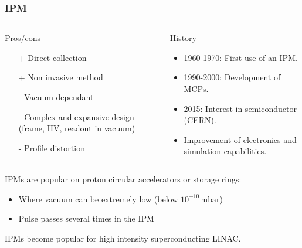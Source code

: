 \begin{frame}
  \frametitle{IPM}
  \begin{columns}[T]
    \begin{column}{0.45\textwidth}
      \begin{block}{Pros/cons}
        \begin{itemize}
          \item[+] Direct collection
          \item[+] Non invasive method
          \item[-] Vacuum dependant
          \item[-] Complex and expansive design (frame, HV, readout in vacuum)
          \item[-] Profile distortion
        \end{itemize}
      \end{block}

    \end{column}
    \begin{column}{0.45\textwidth}
      \begin{block}{History}
        \begin{itemize}
          \item 1960-1970: First use of an IPM.
          \item 1990-2000: Development of MCPs.
          \item 2015: Interest in semiconductor (CERN).
          \item Improvement of electronics and simulation capabilities.
        \end{itemize}
      \end{block}
    \end{column}
  \end{columns}


  IPMs are popular on proton circular accelerators or storage rings:
  \begin{itemize}
    \item Where vacuum can be extremely low (below $10^{-10}\,\mathrm{mbar}$)
    \item Pulse passes several times in the IPM
  \end{itemize}
  IPMs become popular for high intensity superconducting LINAC.
\end{frame}

